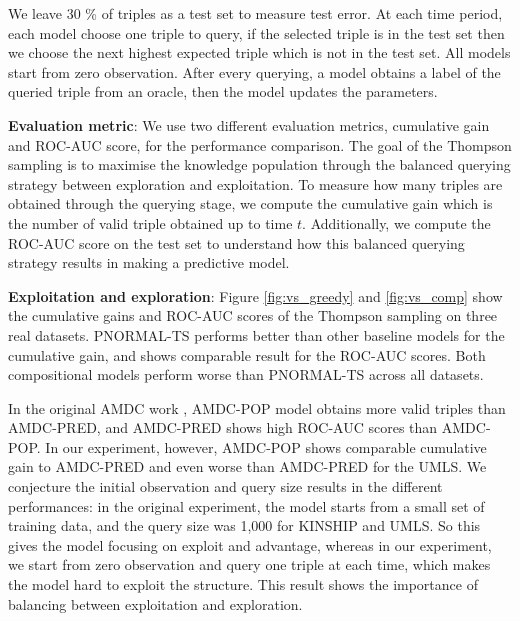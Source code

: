 We leave 30 \% of triples as a test set to measure test error. 
At each time period, each model choose one triple to query, 
if the selected triple is in the test set then we choose the next highest expected triple which is not in the test set.
All models start from zero observation. 
After every querying, a model obtains a label of the queried triple from an oracle,
then the model updates the parameters. 

\textbf{Evaluation metric}: We use two different evaluation metrics, cumulative gain and ROC-AUC score,
for the performance comparison. The goal of the Thompson sampling is to maximise the knowledge 
population through the balanced querying strategy between exploration and exploitation. 
To measure how many triples are obtained through the querying stage, we compute the cumulative 
gain which is the number of valid triple obtained up to time $t$. Additionally, we compute the ROC-AUC score on 
the test set to understand how this balanced querying strategy results in making a predictive model.

\textbf{Exploitation and exploration}: 
Figure \ref{fig:vs_greedy} and \ref{fig:vs_comp} show
the cumulative gains and ROC-AUC scores of the Thompson sampling on three real datasets.
PNORMAL-TS performs better than other baseline models for the cumulative gain, and shows comparable result for the ROC-AUC scores. Both compositional models perform worse than PNORMAL-TS across all datasets.

In the original AMDC work \cite{kajino2015active}, AMDC-POP model obtains more 
valid triples than AMDC-PRED, and AMDC-PRED shows high ROC-AUC scores than AMDC-POP. 
In our experiment, however, AMDC-POP shows comparable cumulative gain to AMDC-PRED 
and even worse than AMDC-PRED for the UMLS. We conjecture the initial observation and query size results in the different performances: in the original experiment, the model starts
from a small set of training data, and the query size was 1,000 for KINSHIP and UMLS. So this gives the model focusing on exploit and advantage, 
whereas in our experiment, we start from zero 
observation and query one triple at each time, which makes the model hard to exploit the structure. This result shows 
the importance of balancing between exploitation and exploration.

